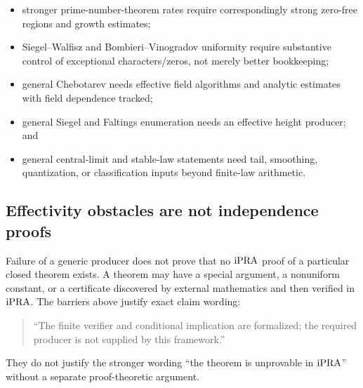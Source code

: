 \begin{itemize}
\item stronger prime-number-theorem rates require correspondingly strong zero-free
regions and growth estimates;
\item Siegel--Walfisz and Bombieri--Vinogradov uniformity require substantive control of
exceptional characters/zeros, not merely better bookkeeping;
\item general Chebotarev needs effective field algorithms and analytic estimates with
field dependence tracked;
\item general Siegel and Faltings enumeration needs an effective height producer; and
\item general central-limit and stable-law statements need tail, smoothing,
quantization, or classification inputs beyond finite-law arithmetic.
\end{itemize}

\subsection{Effectivity obstacles are not independence proofs}

Failure of a generic producer does not prove that no \(\mathrm{iPRA}\) proof of a particular
closed theorem exists.  A theorem may have a special argument, a nonuniform constant,
or a certificate discovered by external mathematics and then verified in \(\mathrm{iPRA}\).
The barriers above justify exact claim wording:

\begin{quote}
``The finite verifier and conditional implication are formalized; the required
producer is not supplied by this framework.''
\end{quote}

They do not justify the stronger wording ``the theorem is unprovable in \(\mathrm{iPRA}\)''
without a separate proof-theoretic argument.
